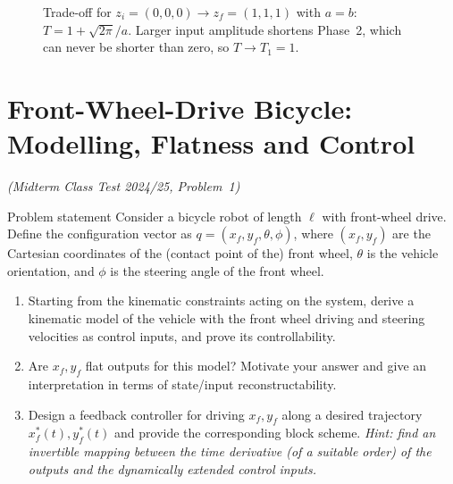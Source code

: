 \documentclass[11pt,a4paper]{article}
\def\boldsymbol#1{#1}%
\newcommand{\q}{\boldsymbol{q}}
\newcommand{\z}{\boldsymbol{z}}
\theoremstyle{definition}
\theoremstyle{plain}
\theoremstyle{remark}
\begin{document}
\begin{figure}[H]
\centering
{}
\caption{Trade-off for $\z_i=(0,0,0)\to\z_f=(1,1,1)$ with $a=b$: $T=1+\sqrt{2\pi}/a$. Larger input amplitude shortens Phase~2, which can never be shorter than zero, so $T\to T_1=1$.}
\end{figure}

\section{Front-Wheel-Drive Bicycle: Modelling, Flatness and Control}
\label{sec:bicycle}
\emph{(Midterm Class Test 2024/25, Problem~1)}

\begin{problem}{Problem statement}
Consider a bicycle robot of length $\ell$ with front-wheel drive. Define the configuration vector as $\q=(x_f,y_f,\theta,\phi)$, where $(x_f,y_f)$ are the Cartesian coordinates of the (contact point of the) front wheel, $\theta$ is the vehicle orientation, and $\phi$ is the steering angle of the front wheel.
\begin{enumerate}[label=(\alph*),nosep]
  \item Starting from the kinematic constraints acting on the system, derive a kinematic model of the vehicle with the front wheel driving and steering velocities as control inputs, and prove its controllability.
  \item Are $x_f,y_f$ flat outputs for this model? Motivate your answer and give an interpretation in terms of state/input reconstructability.
  \item Design a feedback controller for driving $x_f,y_f$ along a desired trajectory $x_f^*(t),y_f^*(t)$ and provide the corresponding block scheme. \emph{Hint: find an invertible mapping between the time derivative (of a suitable order) of the outputs and the dynamically extended control inputs.}
\end{enumerate}
\end{problem}
\end{document}
